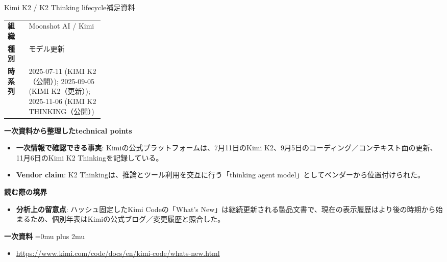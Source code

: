 \begin{technicalnote}{Kimi K2 / K2 Thinking lifecycle}{補足資料}
\begingroup
\begin{tabularx}{\linewidth}{@{}>{\bfseries}p{0.22\linewidth}X@{}}
組織 & Moonshot AI / Kimi \\
種別 & モデル更新 \\
時系列 & 2025-07-11 (KIMI K2（公開）); 2025-09-05 (KIMI K2（更新）); 2025-11-06 (KIMI K2 THINKING（公開）) \\
\end{tabularx}
\smallskip
{\bfseries 一次資料から整理したtechnical points}
\begin{itemize}[leftmargin=1.5em,itemsep=0.35em]
\item \textbf{一次情報で確認できる事実}: Kimiの公式プラットフォームは、7月11日のKimi K2、9月5日のコーディング／コンテキスト面の更新、11月6日のKimi K2 Thinkingを記録している。
\item \textbf{Vendor claim}: K2 Thinkingは、推論とツール利用を交互に行う「thinking agent model」としてベンダーから位置付けられた。
\end{itemize}
\begin{minipage}{\linewidth}
{\bfseries 読む際の境界}
\begin{itemize}[leftmargin=1.5em,itemsep=0.35em]
\item \textbf{分析上の留意点}: ハッシュ固定したKimi Codeの「What's New」は継続更新される製品文書で、現在の表示履歴はより後の時期から始まるため、個別年表はKimiの公式ブログ／変更履歴と照合した。
\end{itemize}
\begin{samepage}
{\bfseries 一次資料}
\begingroup\sloppy
\Urlmuskip=0mu plus 2mu\relax
\begin{itemize}[leftmargin=1.5em,itemsep=0.25em]
\item {\scriptsize\url{https://www.kimi.com/code/docs/en/kimi-code/whats-new.html}}
\end{itemize}
\endgroup
\end{samepage}
\end{minipage}
\endgroup
\end{technicalnote}
\medskip


